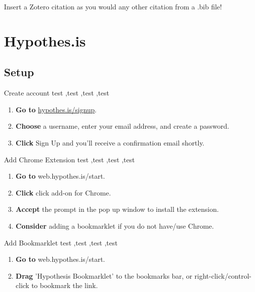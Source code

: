\documentclass[10pt,a4paper]{article}
\begin{document}
 
Insert a Zotero citation as you would any other citation from a .bib file!





\section{Hypothes.is}
\subsection{Setup}

\begin{textbox}{Create account}
test  \sep test \sep test \sep test

\bigskip

\begin{enumerate}
\item \textbf{Go to} \href{hypothes.is/signup}{hypothes.is/signup}. 
\item \textbf{Choose} a username, enter your email address, and create a password.
\item \textbf{Click} Sign Up and you’ll receive a confirmation email shortly. 
\end{enumerate}

\end{textbox}

\begin{textbox}{Add Chrome Extension}
test  \sep test \sep test \sep test

\bigskip

\begin{enumerate}
\item \textbf{Go to} web.hypothes.is/start. 
\item \textbf{Click} click add-on for Chrome.
\item \textbf{Accept} the prompt in the pop up window to install the extension. 
\item \textbf{Consider} adding a bookmarklet if you do not have/use Chrome.
\end{enumerate}

\end{textbox}

\begin{textbox}{Add Bookmarklet}
test  \sep test \sep test \sep test

\bigskip

\begin{enumerate}
\item \textbf{Go to} web.hypothes.is/start. 
\item \textbf{Drag} 'Hypothesis Bookmarklet' to the bookmarks bar, or right-click/control-click to bookmark the link.
\end{enumerate}


\end{textbox}
\end{document}
